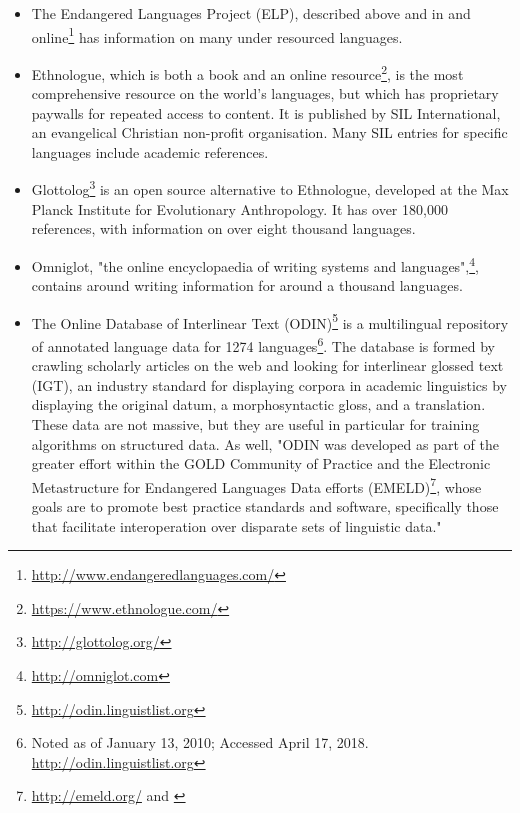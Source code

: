 \begin{itemize}

\item The Endangered Languages Project (ELP), described above and in \citet{lee2016assessing} and online\footnote{\href{http://www.endangeredlanguages.com/}{http://www.endangeredlanguages.com/}} has information on many under resourced languages.

\item Ethnologue, which is both a book \citep{lewis2009ethnologue} and an online resource\footnote{\href{https://www.ethnologue.com/}{https://www.ethnologue.com/}}, is the most comprehensive resource on the world's languages, but which has proprietary paywalls for repeated access to content. It is published by SIL International, an evangelical Christian non-profit organisation. Many SIL entries for specific languages include academic references.

\item Glottolog\footnote{\href{http://glottolog.org/}{http://glottolog.org/}} is an open source alternative to Ethnologue, developed at the Max Planck Institute for Evolutionary Anthropology. It has over 180,000 references, with information on over eight thousand languages. \citep{hammarstrom2015glottolog}

\item Omniglot, "the online encyclopaedia of writing systems and languages",\footnote{\href{http://omniglot.com}{http://omniglot.com}}, contains around writing information for around a thousand languages. \citep{ager2008omniglot}

\item The Online Database of Interlinear Text (ODIN)\footnote{\href{http://odin.linguistlist.org}{http://odin.linguistlist.org}} is a multilingual repository of annotated language data for 1274 languages\footnote{Noted as of January 13, 2010; Accessed April 17, 2018. \href{http://odin.linguistlist.org}{http://odin.linguistlist.org}}. The database is formed by crawling scholarly articles on the web and looking for interlinear glossed text (IGT), an industry standard for displaying corpora in academic linguistics by displaying the original datum, a morphosyntactic gloss, and a translation. These data are not massive, but they are useful in particular for training algorithms on structured data. As well, "ODIN was developed as part of the greater effort within the GOLD Community of Practice \citep{farrar2007gold} and the Electronic Metastructure for Endangered Languages Data efforts (EMELD)\footnote{\href{http://emeld.org/}{http://emeld.org/} and \citet{farrar2002common}}, whose goals are to promote best practice standards and software, specifically those that facilitate interoperation over disparate sets of linguistic data." \citep{lewis2010developing}


\end{itemize}
